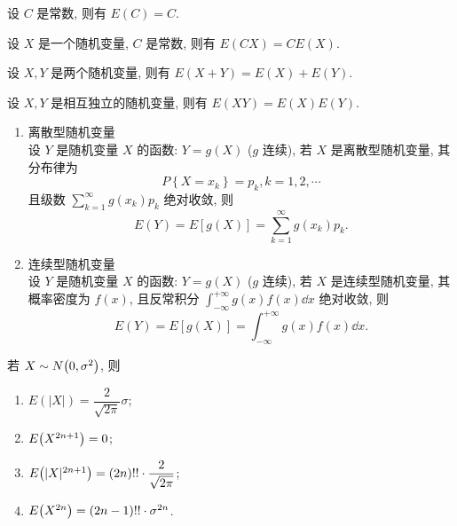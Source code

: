 \begin{theorem}[常数的数学期望]
    设 $ C $ 是常数, 则有 $ E(C)=C.$ 
\end{theorem}
\begin{theorem}
    设 $ X $ 是一个随机变量, $ C $ 是常数, 则有 $ E(C X)=C E(X) .$
\end{theorem}
\begin{theorem}
    设 $ X, Y $ 是两个随机变量, 则有 $ E(X+Y)=E(X)+E(Y).$
\end{theorem}
\begin{theorem}
    设 $ X, Y $ 是相互独立的随机变量, 则有 $ E(X Y)=E(X) E(Y) .$
\end{theorem}

\begin{definition}[一维随机变量函数的数学期望]
    \begin{enumerate}[label=(\arabic{*})]
        \item 离散型随机变量\\
              设 $ Y $ 是随机变量 $ X $ 的函数: $Y=g(X) $ ($g $ 连续), 若 $ X $ 是离散型随机变量, 其分布律为
              $$P\left\{X=x_{k}\right\}=p_{k}, k=1,2, \cdots$$
              且级数 $ \displaystyle\sum_{k=1}^{\infty} g\left(x_{k}\right) p_{k} $ 绝对收敛, 则
              $$E(Y)=E[g(X)]=\sum_{k=1}^{\infty} g\left(x_{k}\right) p_{k}.$$
        \item 连续型随机变量\\
              设 $ Y $ 是随机变量 $ X $ 的函数: $Y=g(X) $ ($g $ 连续), 若 $ X $ 是连续型随机变量, 其概率密度为 $f(x) $, 
              且反常积分 $ \displaystyle\int_{-\infty}^{+\infty} g(x) f(x) \dd  x $ 绝对收敛, 则
              $$E(Y)=E[g(X)]=\int_{-\infty}^{+\infty} g(x) f(x) \dd  x .$$
    \end{enumerate}
\end{definition}

\begin{theorem}
    若 $X\sim N\qty(0,\sigma^2)$, 则 
    \begin{enumerate}[label=(\arabic{*})]
        \item $E(|X|)=\dfrac{2}{\sqrt{2\pi}}\sigma$;
        \item $E\qty(X^{2n+1})=0$;
        \item $E\qty(|X|^{2n+1})=(2n)!!\cdot\dfrac{2}{\sqrt{2\pi}}$;
        \item $E\qty(X^{2n})=(2n-1)!!\cdot\sigma^{2n}$.
    \end{enumerate}
\end{theorem}

